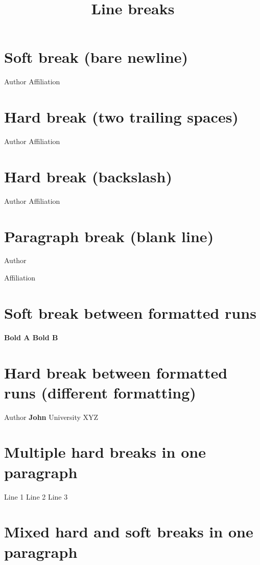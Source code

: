\documentclass[11pt,a4paper]{article}
\title{Line breaks}
\begin{document}
\maketitle

\section{Soft break (bare newline)}

Author Affiliation

\section{Hard break (two trailing spaces)}

Author
Affiliation

\section{Hard break (backslash)}

Author
Affiliation

\section{Paragraph break (blank line)}

Author

Affiliation

\section{Soft break between formatted runs}

\textbf{Bold A Bold B}

\section{Hard break between formatted runs (different formatting)}

Author \textbf{John}
University XYZ

\section{Multiple hard breaks in one paragraph}

Line 1
Line 2
Line 3

\section{Mixed hard and soft breaks in one paragraph}
\end{document}
